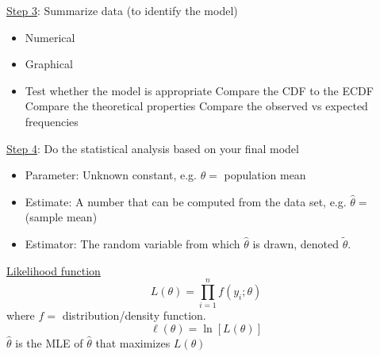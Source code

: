 \underline{Step 3}: Summarize data (to identify the model)
\begin{itemize}
    \item Numerical
    \item Graphical
    \item Test whether the model is appropriate
          \subitem Compare the CDF to the ECDF
          \subitem Compare the theoretical properties
          \subitem Compare the observed vs expected frequencies
\end{itemize}

\underline{Step 4}: Do the statistical analysis based on your final model
\begin{itemize}
    \item Parameter: Unknown constant, e.g. $ \theta= $ population mean
    \item Estimate: A number that can be computed from the data set, e.g.
          $ \hat{\theta}= $ (sample mean)
    \item Estimator: The random variable from which $ \hat{\theta} $ is drawn,
          denoted $ \tilde{\theta} $.
\end{itemize}

\underline{Likelihood function}
\[ L(\theta)=\prod_{i=1}^n f(y_i;\theta) \]
where $ f= $ distribution/density function.
\[ \ell(\theta)=\ln\left[ L(\theta) \right] \]
$ \hat{\theta} $ is the MLE of $ \hat{\theta} $ that maximizes $ L(\theta) $


